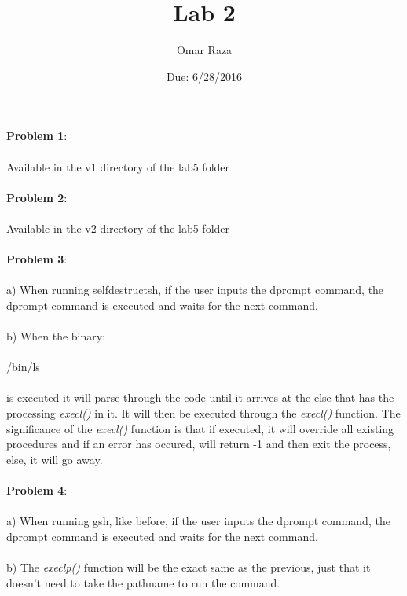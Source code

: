 \documentclass[12pt]{article}
\title{\vspace{-2.0cm} Lab 2}
\author{Omar Raza}
\date{Due: 6/28/2016}
\newcommand{\tab}[0]{\indent \indent}
\newcommand{\enter}[0]{\\ \tab}
\newcommand{\nextline}[0]{\\ \enter}
\newcommand{\codeindent}[0]{\\ \enter \indent}
\begin{document}
\maketitle
\noindent
\textbf{Problem 1}: \nextline Available in the v1 directory of the lab5 folder \\\\
\textbf{Problem 2}: \nextline Available in the v2 directory of the lab5 folder \\\\
\textbf{Problem 3}: \nextline a) When running selfdestructsh, if the user inputs the dprompt command, the dprompt \tab command is executed and waits for the next command. \nextline b) When the binary: \codeindent /bin/ls \nextline is executed it will parse through the code until it arrives at the else that has the \tab processing \textit{execl()} in it. It will then be executed through the \textit{execl()} function. The \tab significance of the \textit{execl()} function is that if executed, it will override all existing \enter procedures and if an error has occured, will return -1 and then exit the process, else, \tab it will go away. \\\\
\textbf{Problem 4}: \nextline a) When running gsh, like before, if the user inputs the dprompt command, the \tab dprompt command is executed and waits for the next command. \nextline b) The \textit{execlp()} function will be the exact same as the previous, just that it doesn't  \tab need to take the pathname to run the command.\\\\
\end{document}
